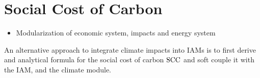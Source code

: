 \documentclass[preprint,3p,authoryear]{elsarticle}
\begin{document}

\section{Social Cost of Carbon}
\label{sec:SCC}

\begin{itemize}
\item Modularization of economic system, impacts and energy system
\end{itemize}
An alternative approach to integrate climate impacts into IAMs is to first derive and analytical formula for the social cost of carbon $\operatorname{SCC}$ and soft couple it with the IAM, and the climate module.
\end{document}
